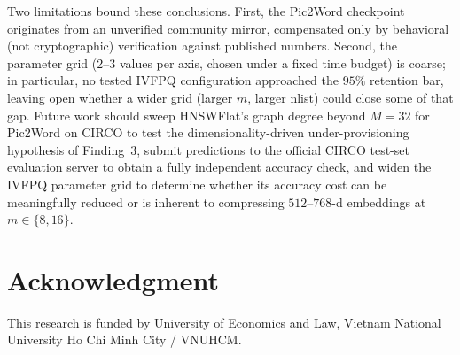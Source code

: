 \documentclass[conference]{IEEEtran}
\begin{document}
Two limitations bound these conclusions. First, the Pic2Word checkpoint originates from an unverified community mirror, compensated only by behavioral (not cryptographic) verification against published numbers. Second, the parameter grid (2--3 values per axis, chosen under a fixed time budget) is coarse; in particular, no tested IVFPQ configuration approached the $95\%$ retention bar, leaving open whether a wider grid (larger $m$, larger nlist) could close some of that gap. Future work should sweep HNSWFlat's graph degree beyond $M{=}32$ for Pic2Word on CIRCO to test the dimensionality-driven under-provisioning hypothesis of Finding~3, submit predictions to the official CIRCO test-set evaluation server to obtain a fully independent accuracy check, and widen the IVFPQ parameter grid to determine whether its accuracy cost can be meaningfully reduced or is inherent to compressing $512$--$768$-d embeddings at $m\in\{8,16\}$.

\section*{Acknowledgment}
This research is funded by University of Economics and Law, Vietnam National University Ho Chi Minh City / VNUHCM.

\begingroup
\small


\endgroup
\end{document}
